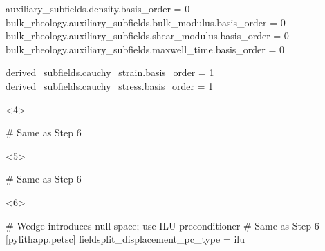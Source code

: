 \documentclass[aspectratio=169]{beamer}
\begin{document}
\begin{frame}[t,fragile]
\begin{minipage}[t]{0.67\textwidth}
\begin{onlyenv}
\begin{cfgcode}
        auxiliary_subfields.density.basis_order = 0
        bulk_rheology.auxiliary_subfields.bulk_modulus.basis_order = 0
        bulk_rheology.auxiliary_subfields.shear_modulus.basis_order = 0
        bulk_rheology.auxiliary_subfields.maxwell_time.basis_order = 0
        
        derived_subfields.cauchy_strain.basis_order = 1
        derived_subfields.cauchy_stress.basis_order = 1
      \end{cfgcode}
    \end{onlyenv}
    \begin{onlyenv}<4>
      \begin{cfgcode}
        # Same as Step 6
      \end{cfgcode}
    \end{onlyenv}
    \begin{onlyenv}<5>
      \begin{cfgcode}
        # Same as Step 6
      \end{cfgcode}
    \end{onlyenv}
    \begin{onlyenv}<6>
      \begin{cfgcode}
        # Wedge introduces null space; use ILU preconditioner
        # Same as Step 6
        [pylithapp.petsc]
        fieldsplit_displacement_pc_type = ilu
      \end{cfgcode}
    \end{onlyenv}
  \end{minipage}

  
\end{frame}
\end{document}
